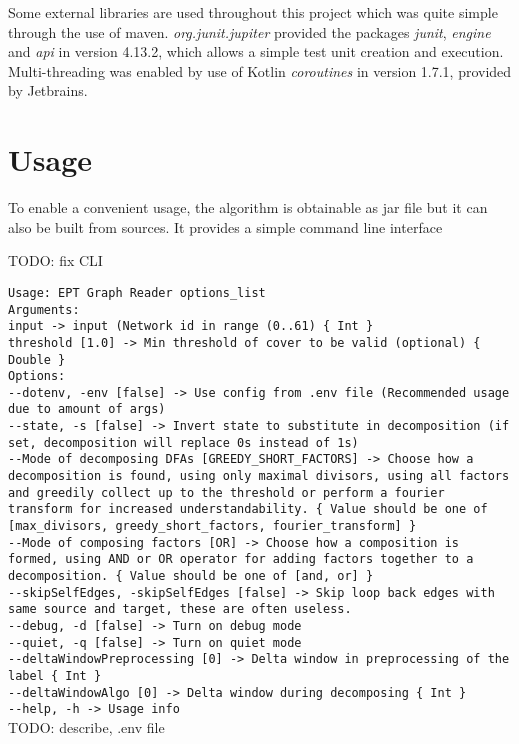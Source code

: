 Some external libraries are used throughout this project which was quite simple through the use of maven. \emph{org.junit.jupiter} provided the packages \emph{junit}, \emph{engine} and \emph{api} in version 4.13.2, which allows a simple test unit creation and execution. Multi-threading was enabled by use of Kotlin \emph{coroutines} in version 1.7.1, provided by Jetbrains.

\section{Usage}
To enable a convenient usage, the algorithm is obtainable as jar file but it can also be built from sources. It provides a simple command line interface

TODO: fix CLI

\verb|Usage: EPT Graph Reader options_list|\\
\verb|Arguments: |\\
\verb|input -> input (Network id in range (0..61) { Int }|\\
\verb|threshold [1.0] -> Min threshold of cover to be valid (optional) { Double }|\\
\verb|Options: |\\
\verb|--dotenv, -env [false] -> Use config from .env file (Recommended usage due to amount of args) |\\
\verb|--state, -s [false] -> Invert state to substitute in decomposition (if set, decomposition will replace 0s instead of 1s) |\\
\verb|--Mode of decomposing DFAs [GREEDY_SHORT_FACTORS] -> Choose how a decomposition is found, using only maximal divisors, using all factors and greedily collect up to the threshold or perform a fourier transform for increased understandability. { Value should be one of [max_divisors, greedy_short_factors, fourier_transform] }|\\
\verb|--Mode of composing factors [OR] -> Choose how a composition is formed, using AND or OR operator for adding factors together to a decomposition. { Value should be one of [and, or] }|\\
\verb|--skipSelfEdges, -skipSelfEdges [false] -> Skip loop back edges with same source and target, these are often useless. |\\
\verb|--debug, -d [false] -> Turn on debug mode |\\
\verb|--quiet, -q [false] -> Turn on quiet mode |\\
\verb|--deltaWindowPreprocessing [0] -> Delta window in preprocessing of the label { Int }|\\
\verb|--deltaWindowAlgo [0] -> Delta window during decomposing { Int }|\\
\verb|--help, -h -> Usage info |\\

TODO: describe, .env file
